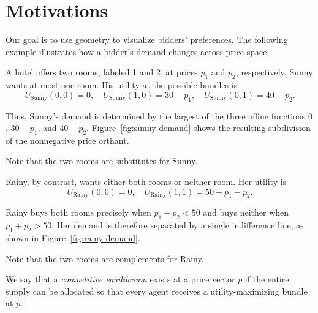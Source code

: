 \documentclass[../../main.tex]{subfiles}
\begin{document}
\section{Motivations}

Our goal is to use geometry to visualize bidders' preferences.
The following example illustrates how a bidder's demand changes
across price space.

\begin{example} \label{example:sunny-rainy}
    A hotel offers two rooms, labeled 1 and 2, at prices $p_1$ and $p_2$,
    respectively. Sunny wants at most one room. His utility at the possible
    bundles is
    \[
        U_{\text{Sunny}}(0,0)=0,\quad
        U_{\text{Sunny}}(1,0)=30-p_1,\quad
        U_{\text{Sunny}}(0,1)=40-p_2.
    \]

    Thus, Sunny's demand is determined by the largest of the three affine
    functions $0$, $30-p_1$, and $40-p_2$. Figure~\ref{fig:sunny-demand}
    shows the resulting subdivision of the nonnegative price orthant.

    \SunnyDemandFigure

    Note that the two rooms are substitutes for Sunny.

    Rainy, by contrast, wants either both rooms or neither room. Her utility is
    \[
        U_{\text{Rainy}}(0,0)=0,\quad
        U_{\text{Rainy}}(1,1)=50-p_1-p_2.
    \]

    Rainy buys both rooms precisely when $p_1+p_2<50$ and buys neither
    when $p_1+p_2>50$. Her demand is therefore separated by a single
    indifference line, as shown in Figure~\ref{fig:rainy-demand}.

    \RainyDemandFigure

    Note that the two rooms are complements for Rainy.
\end{example}

We say that a \textit{competitive equilibrium} exists at a price vector $p$ if
the entire supply can be allocated so that every agent receives a
utility-maximizing bundle at $p$.
\end{document}
